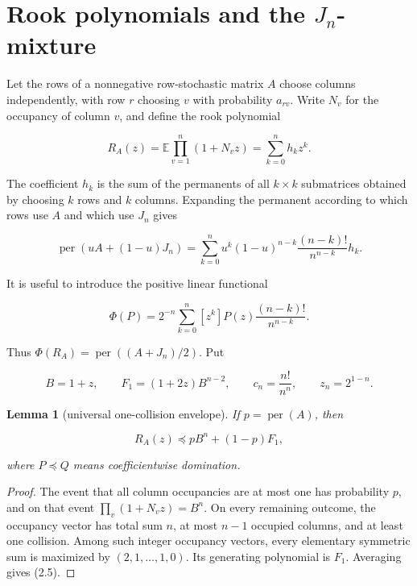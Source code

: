 \documentclass[11pt]{article}
\newtheorem{lemma}[theorem]{Lemma}
\begin{document}
\section{Rook polynomials and the $J_n$-mixture}


Let the rows of a nonnegative row-stochastic matrix $A$ choose columns independently,
with row $r$ choosing $v$ with probability $a_{rv}$.  Write $N_v$ for the
occupancy of column $v$, and define the rook polynomial

\[
R_A(z)=\mathbb E\prod_{v=1}^n(1+N_vz)=\sum_{k=0}^n h_kz^k. \tag{2.1}
\]

The coefficient $h_k$ is the sum of the permanents of all $k\times k$ submatrices
obtained by choosing $k$ rows and $k$ columns.  Expanding the permanent according
to which rows use $A$ and which use $J_n$ gives

\[
\operatorname{per}(uA+(1-u)J_n)
=\sum_{k=0}^n u^k(1-u)^{n-k}\frac{(n-k)!}{n^{n-k}}h_k. \tag{2.2}
\]

It is useful to introduce the positive linear functional

\[
\Phi(P)=2^{-n}\sum_{k=0}^n[z^k]P(z)\frac{(n-k)!}{n^{n-k}}. \tag{2.3}
\]

Thus $\Phi(R_A)=\operatorname{per}((A+J_n)/2)$.  Put

\[
B=1+z,\qquad F_1=(1+2z)B^{n-2},\qquad
c_n=\frac{n!}{n^n},\qquad z_n=2^{1-n}. \tag{2.4}
\]

\Needspace{0.18\textheight}
\begin{lemma}[universal one-collision envelope]

If $p=\operatorname{per}(A)$, then

\[
R_A(z)\preceq pB^n+(1-p)F_1, \tag{2.5}
\]

where $P\preceq Q$ means coefficientwise domination.

\end{lemma}

\begin{proof}


The event that all column occupancies are at most one has probability $p$, and on
that event $\prod_v(1+N_vz)=B^n$.  On every remaining outcome, the occupancy vector
has total sum $n$, at most $n-1$ occupied columns, and at least one collision.
Among such integer occupancy vectors, every elementary symmetric sum is maximized by
$(2,1,\ldots,1,0)$.  Its generating polynomial is $F_1$.  Averaging gives (2.5).

\end{proof}
\end{document}
